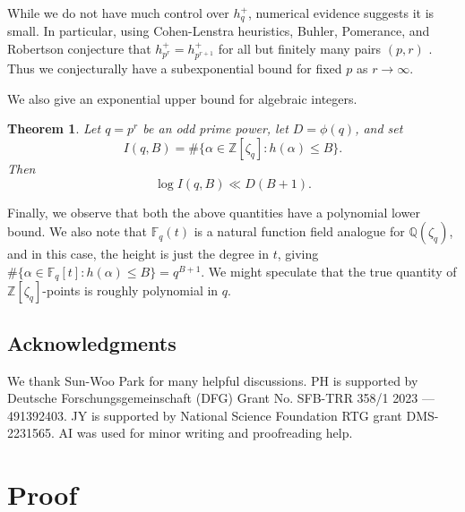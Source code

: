 \documentclass{article}
\newtheorem{thm}{Theorem}
\newcommand{\bF}{\mathbb{F}}
\newcommand{\bQ}{\mathbb{Q}}
\newcommand{\bZ}{\mathbb{Z}}
\def\bbF{ {\mathbb F}}
\begin{document}
While we do not have much control over $h^+_q$, numerical evidence suggests it is small. In particular, using Cohen-Lenstra heuristics, Buhler, Pomerance, and Robertson conjecture that $h_{p^r}^+=h_{p^{r+1}}^+$ for all but finitely many pairs $(p,r)$ \cite{BPR2004}. Thus we conjecturally have a subexponential bound for fixed $p$ as $r \to \infty$.

We also give an exponential upper bound for algebraic integers.


\begin{thm} \label{thm:integers}
Let $q=p^r$ be an odd prime power, let $D=\phi(q)$, and set
\[
I(q,B)=\#\{ \alpha \in \bZ[\zeta_q] : h(\alpha) \leq B \}.
\]
Then
\[
\log I(q,B) \ll D(B+1).
\]
\end{thm}

Finally, we observe that both the above quantities have a polynomial lower bound. We also note that $\bF_q(t)$ is a natural function field analogue for $\bQ(\zeta_q)$, and in this case, the height is just the degree in $t$, giving $\# \{\alpha \in \bbF_q[t]: h(\alpha) \leq B\} = q^{B+1}$. We might speculate that the true quantity of $\bZ[\zeta_q]$-points is roughly polynomial in $q$.

\subsection{Acknowledgments}
We thank Sun-Woo Park for many helpful discussions. PH is supported by Deutsche Forschungsgemeinschaft (DFG) Grant No. SFB-TRR 358/1 2023 — 491392403. JY is supported by National Science Foundation RTG grant DMS-2231565. AI was used for minor writing and proofreading help. 

\section{Proof}
\end{document}
